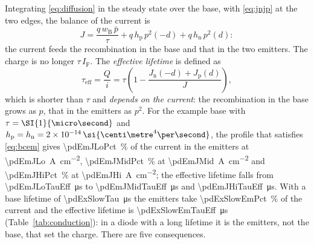 \documentclass[10pt,a4paper]{scrartcl}
\newcommand{\IF}{I_\mathrm{F}}
\newcommand{\wB}{w_\mathrm{B}}
\newcommand{\Jn}{J_\mathrm{n}}
\newcommand{\Jp}{J_\mathrm{p}}
\begin{document}
Integrating \eqref{eq:diffusion} in the steady state over the base, with \eqref{eq:jnjp} at the two edges, the balance of the current is
\begin{equation}
J = \frac{q\,\wB\,\bar p}{\tau} + q\,h_\mathrm{p}\,p^2(-d) + q\,h_\mathrm{n}\,p^2(d) :
\label{eq:emitterbal}
\end{equation}
the current feeds the recombination in the base and that in the two emitters. The charge is no longer $\tau\,\IF$. The \emph{effective lifetime} is defined as
\begin{equation}
\tau_\mathrm{eff} = \frac{Q}{i} = \tau\left(1 - \frac{\Jn(-d) + \Jp(d)}{J}\right) ,
\label{eq:taueff}
\end{equation}
which is shorter than $\tau$ and \emph{depends on the current}: the recombination in the base grows as $p$, that in the emitters as $p^2$. For the example base with $\tau = \SI{\pdExMidTau}{\micro\second}$ and $h_\mathrm{p} = h_\mathrm{n} = \pdHem\,\si{\centi\metre^4\per\second}$, the profile that satisfies \eqref{eq:bcem} gives \SI{\pdEmJLoPct}{\percent} of the current in the emitters at \SI{\pdEmJLo}{\ampere\per\centi\metre\squared}, \SI{\pdEmJMidPct}{\percent} at \SI{\pdEmJMid}{\ampere\per\centi\metre\squared} and \SI{\pdEmJHiPct}{\percent} at \SI{\pdEmJHi}{\ampere\per\centi\metre\squared}; the effective lifetime falls from \SI{\pdEmJLoTauEff}{\micro\second} to \SI{\pdEmJMidTauEff}{\micro\second} and \SI{\pdEmJHiTauEff}{\micro\second}. With a base lifetime of \SI{\pdExSlowTau}{\micro\second} the emitters take \SI{\pdExSlowEmPct}{\percent} of the current and the effective lifetime is \SI{\pdExSlowEmTauEff}{\micro\second} (Table~\ref{tab:conduction}): in a diode with a long lifetime it is the emitters, not the base, that set the charge. There are five consequences.
\end{document}
